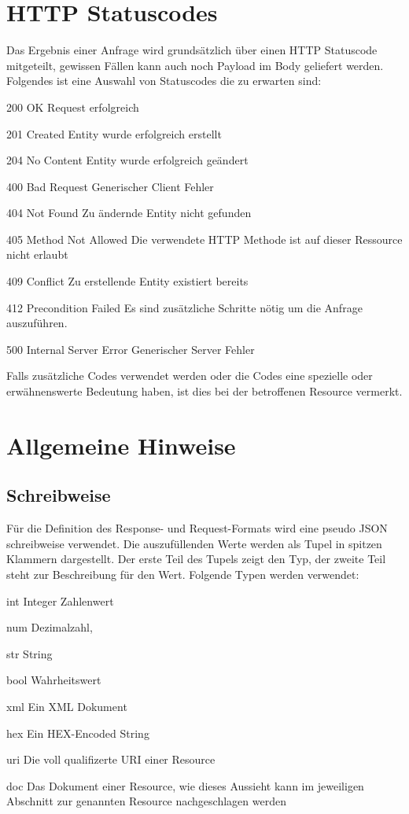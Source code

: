 \documentclass[10pt,a4paper]{scrartcl}
\begin{document}
\pagebreak
\section{HTTP Statuscodes}
Das Ergebnis einer Anfrage wird grundsätzlich über einen HTTP Statuscode mitgeteilt, gewissen Fällen
kann auch noch Payload im Body geliefert werden. Folgendes ist eine Auswahl von Statuscodes die zu
erwarten sind:

\begin{description*}
	\item[200 OK] Request erfolgreich
	\item[201 Created] Entity wurde erfolgreich erstellt
	\item[204 No Content] Entity wurde erfolgreich geändert
	\item[400 Bad Request] Generischer Client Fehler
	\item[404 Not Found] Zu ändernde Entity nicht gefunden
	\item[405 Method Not Allowed] Die verwendete HTTP Methode ist auf dieser Ressource nicht erlaubt
	\item[409 Conflict] Zu erstellende Entity existiert bereits
	\item[412 Precondition Failed] Es sind zusätzliche Schritte nötig um die Anfrage auszuführen.
	\item[500 Internal Server Error] Generischer Server Fehler
\end{description*}

Falls zusätzliche Codes verwendet werden oder die Codes eine spezielle oder erwähnenswerte Bedeutung haben, ist dies bei der betroffenen Resource vermerkt.


\pagebreak
\section{Allgemeine Hinweise}

\subsection{Schreibweise}
Für die Definition des Response- und Request-Formats wird eine pseudo JSON schreibweise verwendet. Die
auszufüllenden Werte werden als Tupel in spitzen Klammern dargestellt. Der erste Teil des Tupels zeigt 
den Typ, der zweite Teil steht zur Beschreibung für den Wert. Folgende Typen werden verwendet:
\begin{description*}
	\item[int] Integer Zahlenwert
	\item[num] Dezimalzahl, 
	\item[str] String
	\item[bool] Wahrheitswert
	\item[xml] Ein XML Dokument
	\item[hex] Ein HEX-Encoded String
	\item[uri] Die voll qualifizerte URI einer Resource
	\item[doc] Das Dokument einer Resource, wie dieses Aussieht kann im jeweiligen Abschnitt zur genannten Resource nachgeschlagen werden
\end{description*}
\end{document}
